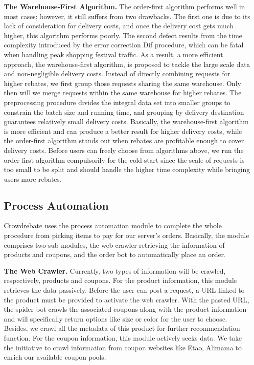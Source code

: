\textbf{The Warehouse-First Algorithm.} The order-first algorithm performs well in most cases; however, it still suffers from two drawbacks. The first one is due to its lack of consideration for delivery costs, and once the delivery cost gets much higher, this algorithm performs poorly. The second defect results from the time complexity introduced by the error correction Dif procedure, which can be fatal when handling peak shopping festival traffic. As a result, a more efficient approach, the warehouse-first algorithm, is proposed to tackle the large scale data and non-negligible delivery costs. Instead of directly combining requests for higher rebates, we first group those requests sharing the same warehouse. Only then will we merge requests within the same warehouse for higher rebates. The preprocessing procedure divides the integral data set into smaller groups to constrain the batch size and running time, and grouping by delivery destination guarantees relatively small delivery costs. Basically, the warehouse-first algorithm is more efficient and can produce a better result for higher delivery costs, while the order-first algorithm stands out when rebates are profitable enough to cover delivery costs. Before users can freely choose from algorithms above, we run the order-first algorithm compulsorily for the cold start since the scale of requests is too small to be split and should handle the higher time complexity while bringing users more rebates.

\subsection{Process Automation}

Crowdrebate uses the process automation module to complete the whole procedure from picking items to pay for our server's orders. Basically, the module comprises two sub-modules, the web crawler retrieving the information of products and coupons, and the order bot to automatically place an order. 

\textbf{The Web Crawler.} Currently, two types of information will be crawled, respectively, products and coupons. For the product information, this module retrieves the data passively. Before the user can post a request, a URL linked to the product must be provided to activate the web crawler. With the pasted URL, the spider bot crawls the associated coupons along with the product information and will specifically return options like size or color for the user to choose. Besides, we crawl all the metadata of this product for further recommendation function. For the coupon information, this module actively seeks data. We take the initiative to crawl information from coupon websites like Etao, Alimama to enrich our available coupon pools. 

